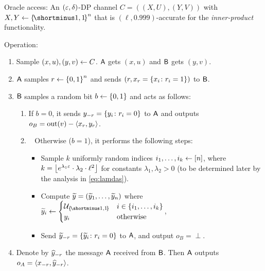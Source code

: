 \begin{protocol}[Protocol $\Pi = (\Ac,\Bc)$]\label{protocol:DPIP-to-AWEC}
	\item Oracle access: An $(\varepsilon,\delta)$-DP channel $C =((X,U),(Y,V))$ with $X,Y \la \oo^n$ that is $(\ell,0.999)$-accurate for the \emph{inner-product} functionality.
	\item Operation:
	\begin{enumerate}
		
		\item Sample $(x,u), (y,v) \gets C$. $\mathsf{A}$ gets $(x,u)$ and $\mathsf{B}$ gets $(y,v)$. 
		
		\item  $\mathsf{A}$ samples  $r \la \zo^n$ and sends $(r,x_{r} = \set{x_i \colon r_i =1})$ to $\mathsf{B}$.
		
		\item $\mathsf{B}$ samples a random bit $b \la \zo$ and acts as follows:
		
		\begin{enumerate}
			
			\item If $b=0$, it sends $y_{-r}= \set{y_i \colon r_i =0}$ to $\mathsf{A}$ and outputs $o_B = {\rm out}(v) - \langle x_r, y_r \rangle$.
			
			\item~\label{step: add noise} Otherwise ($b=1$), it performs the following steps:\label{B_steps_in_abort}
			
			\begin{itemize}
				\item Sample $k$ uniformly random indices $i_1,\ldots,i_k \gets [n]$, where $k = \floor{e^{\lambda_1 \eps} \cdot \lambda_2 \cdot \ell^2}$ for constants $\lambda_1,\lambda_2>0$ (to be determined later by the analysis in \cref{eq:lamdas}).
				\item Compute $\widetilde{y} = (\widetilde{y}_1,\ldots,\widetilde{y}_n)$ where $\ty_i \la \begin{cases} \cU_{\oo} & i \in \set{i_1,\ldots,i_k} \\ y_i & \text{otherwise} \end{cases}$,
				\item Send $\ty_{-r}= \set{\ty_i \colon r_i =0}$ to $\mathsf{A}$, and output $o_B = \perp$.
			\end{itemize}
			
			
		\end{enumerate}
		
		\item  Denote by $\widehat{y}_{-r}$ the message $\mathsf{A}$ received from $\mathsf{B}$. Then $\mathsf{A}$ outputs $o_A =  \langle x_{-r}, \widehat{y}_{-r} \rangle$.
		
		
	\end{enumerate}
\end{protocol}

